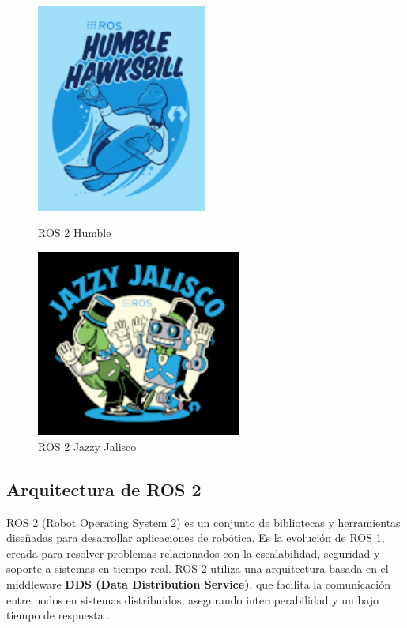     \begin{figure}[h!]
        \centering
        \begin{minipage}{0.45\textwidth}
            \centering
            \includegraphics[width=0.5\textwidth]{pictures/humble_logo.png}
            \caption{ROS 2 Humble}
            \label{fig:imagen1}
        \end{minipage}
        \hfill
        \begin{minipage}{0.45\textwidth}
            \centering
            \includegraphics[width=0.6\textwidth]{pictures/jazzy_logo.png}
            \caption{ROS 2 Jazzy Jalisco}
            \label{fig:imagen2}
        \end{minipage}
    \end{figure}

\subsection{Arquitectura de ROS 2}

    ROS 2 (Robot Operating System 2) es un conjunto de bibliotecas y herramientas diseñadas para desarrollar aplicaciones de robótica. Es la evolución de ROS 1, creada para resolver problemas relacionados con la escalabilidad, seguridad y soporte a sistemas en tiempo real. ROS 2 utiliza una arquitectura basada en el middleware \textbf{DDS (Data Distribution Service)}, que facilita la comunicación entre nodos en sistemas distribuidos, asegurando interoperabilidad y un bajo tiempo de respuesta \cite{ros_docs}.  
    
